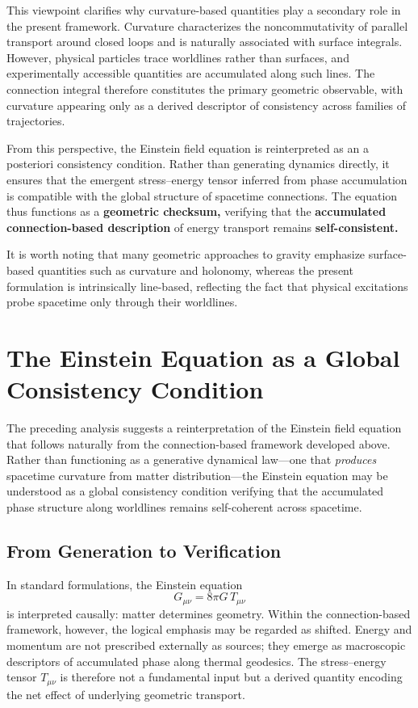 \documentclass[%
 reprint,
 amsmath,amssymb,
 aps,
 prb,
]{revtex4-2}
\numberwithin{equation}{section}
\begin{document}
This viewpoint clarifies why curvature-based quantities play a secondary role in the present framework. 
Curvature characterizes the noncommutativity of parallel transport around closed loops and is naturally associated with surface integrals. 
However, physical particles trace worldlines rather than surfaces, and experimentally accessible quantities are accumulated along such lines. 
The connection integral therefore constitutes the primary geometric observable, with curvature appearing only as a derived descriptor of consistency across families of trajectories.

From this perspective, the Einstein field equation is reinterpreted as an a posteriori consistency condition. 
Rather than generating dynamics directly, it ensures that the emergent stress--energy tensor inferred from phase accumulation is compatible with the global structure of spacetime connections. 
The equation thus functions as a \textbf{geometric checksum,} verifying that the \textbf{accumulated connection-based description} of energy transport remains \textbf{self-consistent.}

It is worth noting that many geometric approaches to gravity emphasize surface-based quantities such as curvature and holonomy, whereas the present formulation is intrinsically line-based, reflecting the fact that physical excitations probe spacetime only through their worldlines.



\section{The Einstein Equation as a Global Consistency Condition}
\label{sec:consistency}

The preceding analysis suggests a reinterpretation of the Einstein field equation that follows naturally from the connection-based framework developed above. Rather than functioning as a generative dynamical law---one that \emph{produces} spacetime curvature from matter distribution---the Einstein equation may be understood as a global consistency condition verifying that the accumulated phase structure along worldlines remains self-coherent across spacetime.

\subsection{From Generation to Verification}
\label{subsec:generation_verification}

In standard formulations, the Einstein equation
\begin{equation}
G_{\mu\nu} = 8\pi G\, T_{\mu\nu}
\end{equation}
is interpreted causally: matter determines geometry. Within the connection-based framework, however, the logical emphasis may be regarded as shifted. Energy and momentum are not prescribed externally as sources; they emerge as macroscopic descriptors of accumulated phase along thermal geodesics. The stress--energy tensor $T_{\mu\nu}$ is therefore not a fundamental input but a derived quantity encoding the net effect of underlying geometric transport.
\end{document}
